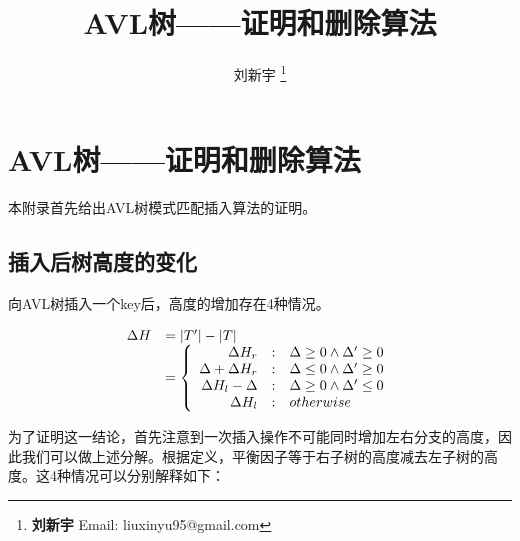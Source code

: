 \documentclass{ctexart}
\begin{document}


\title{AVL树——证明和删除算法}

\author{刘新宇
\thanks{{\bfseries 刘新宇} \newline
  Email: liuxinyu95@gmail.com \newline}
  }

\maketitle
\fi


\ifx\wholebook\relax
\chapter{AVL树——证明和删除算法}
\fi


本附录首先给出AVL树模式匹配插入算法的证明。

\section{插入后树高度的变化}

向AVL树插入一个key后，高度的增加存在4种情况。

\[
\begin{array}{rl}
  \Delta H & = |T'| - |T| \\
              & = \left \{
                  \begin{array}{r@{\quad:\quad}l}
                  \Delta H_r & \Delta \geq 0 \land \Delta' \geq 0 \\
                  \Delta + \Delta H_r & \Delta \leq 0 \land \Delta' \geq 0 \\
                  \Delta H_l - \Delta & \Delta \geq 0 \land \Delta' \leq 0 \\
                  \Delta H_l & otherwise
                  \end{array} \right .
\end{array}
\]

为了证明这一结论，首先注意到一次插入操作不可能同时增加左右分支的高度，因此我们可以做上述分解。根据定义，平衡因子等于右子树的高度减去左子树的高度。这4种情况可以分别解释如下：
\end{document}
